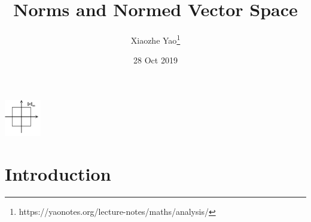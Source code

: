 \documentclass{article}
\title{Norms and Normed Vector Space}
\author{Xiaozhe Yao\footnote{https://yaonotes.org/lecture-notes/maths/analysis/}}
\date{28 Oct 2019}
\theoremstyle{definition}
\begin{document}
\maketitle
\begin{center}
    \includegraphics[width=60px]{Analysis/images/norms.pdf}
\end{center}

\section{Introduction}
\end{document}
